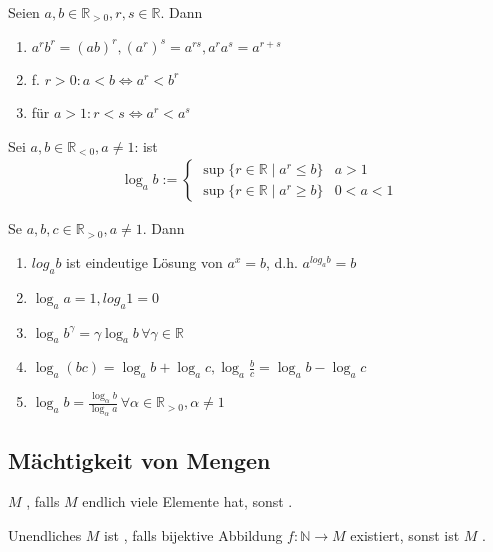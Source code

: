 \begin{proposition}\label{proposition_potenz_r}
	Seien $a,b\in\mathbb{R}_{>0}, r,s\in\mathbb{R}$. Dann
	\begin{enumerate}[label={\arabic*)}]
		\item $a^r b^r = (ab)^r, (a^r)^s = a^{rs}, a^ra^s = a^{r+s}$
		\item f. $r > 0: a < b \Leftrightarrow a^r < b^r$
		\item für $a > 1: r < s \Leftrightarrow a^r < a^s$
	\end{enumerate}
\end{proposition}

\begin{*definition}[Logarithmus]
	Sei $a,b\in\mathbb{R}_{<0}, a\neq 1$:  ist \begin{align*}
	 \log_a b :=\begin{cases}
	 \sup \{ r \in \mathbb{R} \mid a^r \le b\}& a > 1\\
 	\sup \{r\in\mathbb{R}\mid a^r \ge b\}& 0 < a < 1
	 \end{cases}
	\end{align*}
\end{*definition}

\begin{proposition}\label{proposition_logarithmus_r}
	Se $a,b,c\in\mathbb{R}_{>0}, a\neq 1$. Dann
	\begin{enumerate}[label={\arabic*)}]
		\item $log_a b$ ist eindeutige Lösung von $a^x = b$, d.h. $a^{log_a b} = b$
		\item $\log_a a = 1, log_a 1 = 0$
		\item $\log_a b^\gamma = \gamma \log_a b \,\forall \gamma\in\mathbb{R}$
		\item $\log_a(bc) = \log_a b + \log_a c, \log_a \frac{b}{c} = \log_a b - \log_a c$
		\item $\log_a b = \frac{\log_\alpha b}{\log_\alpha a}\,\forall \alpha\in\mathbb{R}_{>0},\alpha\neq 1$
	\end{enumerate}
\end{proposition}

\subsection{Mächtigkeit von Mengen}

\begin{*definition}
	$M$ , falls $M$ endlich viele Elemente hat, sonst .
	
	Unendliches $M$ ist , falls bijektive Abbildung $f:\mathbb{N}\to M$ existiert, sonst ist $M$ .
\end{*definition}

